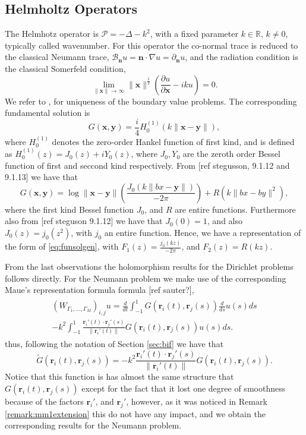 \documentclass{article}
\newcommand{\todo}[1]{{\color{red}[#1]}}
\newcommand{\IR}{{\mathbb R}}
\newcommand{\cP}{\mathcal{P}}
\newcommand{\bn}{\bm{n}}
\newcommand{\br}{\bm{r}}
\newcommand{\bx}{\bm{x}}
\newcommand{\by}{\bm{y}}
\begin{document}
\subsection{Helmholtz Operators}
The Helmhotz operator is $\cP = -\Delta -k^2$, with a fixed parameter $k \in \IR$, $k\neq 0$, typically called wavenumber. For this operator the co-normal trace is reduced to the classical Neumann trace, $\mathbf{\mathcal{B}}_{\bn}u = \bn \cdot \nabla u  = \partial_{\bn} u$, and the radiation condition is the classical Somerfeld condition, 
$$
\lim_{\|\bx\| \rightarrow \infty}
\| \bx \|^{\frac{1}{2}}\left( \frac{\partial u}{\partial \bx}-i k u\right)=0.
$$
We refer to \cite{stephan1984augmented}, \cite{kress1996} for uniqueness of the boundary value problems. The corresponding fundamental solution is
$$
G(\bx,\by) = \frac{i}{4}H^{(1)}_0(k \| \bx-\by\|),
$$
where $H^{(1)}_0$ denotes the zero-order Hankel function of first kind, and is defined as $H^{(1)}_0(z) = J_0(z) + i Y_0(z)$, where $J_0, Y_0$ are the zeroth order Bessel function of first and seccond kind respectively. From \todo{ref stegusson, 9.1.12 and 9.1.13} we have that 
$$
G(\bx,\by) = \log\|\bx-\by\|\left(\frac{J_0(k \|bx -\by\|)}{-2\pi}\right)+ R(k\|bx-by\|^2),
$$
where the first kind Bessel function $J_0$, and $R$ are entire functions.
Furthermore also from \todo{ref steguson 9.1.12} we have that $J_0(0) = 1$, and also $J_0(z) = j_0(z^2)$, with $j_0$ an entire function.  Hence, we have a representation of the form of \eqref{eq:funsolgen}, with $F_1(z) = \frac{j_0(k z)}{-2\pi}$, and $F_2(z) = R(k z)$.

From the last observations the holomorphism results for the Dirichlet problems follows directly. For the Neumann problem we make use of the corresponding Maue's representation formula  formula \todo{ref sauter?},
\begin{align*}
\begin{split}
(W_{\Gamma_1,\hdots,\Gamma_M})_{i,j}u = \frac{d}{dt} \int_{-1}^1 G(\br_i(t),\br_j(s)) \frac{d}{ds} u(s) ds \\- k^2\int_{-1}^1 \frac{\br_i'(t)\cdot \br_j'(s)}{\|\br_i'(t)\|} G(\br_i(t),\br_j(s))u(s) ds. 
\end{split}
\end{align*} 
thus, following the notation of Section \ref{sec:bif} we have that 
$$
\widetilde{G}(\br_i(t),\br_j(s)) = -k^2 \frac{\br_i'(t)\cdot \br_j'(s)}{\|\br_i'(t)\|} G(\br_i(t),\br_j(s)).
$$
Notice that this function is has almost the same structure that $G(\br_i(t),\br_j(s))$ except for the fact that it lost one degree of smoothness because of the factors $\br_i'$, and $\br_j'$, however, as it was noticed in Remark \ref{remark:mm1extension} this do not have any impact, and we obtain the corresponding results for the Neumann problem.
\end{document}
